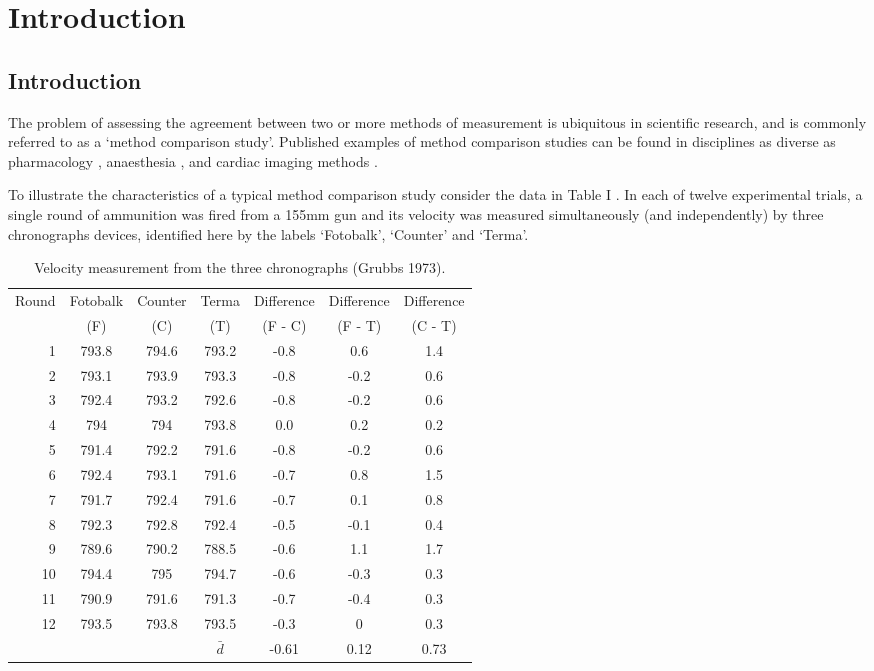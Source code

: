 \documentclass[Main.tex]{subfiles}
\begin{document}
\tableofcontents \setcounter{tocdepth}{2}

\chapter{Introduction}

\section{Introduction}
The problem of assessing the agreement between two or more methods
of measurement is ubiquitous in scientific research, and is
commonly referred to as a `method comparison study'. Published
examples of method comparison studies can be found in disciplines
as diverse as pharmacology \citep{ludbrook97}, anaesthesia
\citep{Myles}, and cardiac imaging methods \citep{Krumm}.


To illustrate the characteristics of a typical method comparison
study consider the data in Table I \citep{Grubbs73}. In each of
twelve experimental trials, a single round of ammunition was fired
from a 155mm gun and its velocity was measured simultaneously (and
independently) by three chronographs devices, identified here by
the labels `Fotobalk', `Counter' and `Terma'.




\begin{table}[ht]
	\begin{center}
		\begin{tabular}{|r|ccc|c|c|c|}

			\hline
Round	&	Fotobalk	&	Counter	&	Terma	&	Difference	&	Difference	&	Difference	\\
&	(F)	&	(C)	&	(T)	&	(F - C)	&	(F - T)	&	(C - T)	\\ 			\hline \hline
1	&	793.8	&	794.6	&	793.2	&	-0.8	&	0.6	&	1.4	\\
2	&	793.1	&	793.9	&	793.3	&	-0.8	&	-0.2	&	0.6	\\
3	&	792.4	&	793.2	&	792.6	&	-0.8	&	-0.2	&	0.6	\\
4	&	794\phantom{.0}	&	794\phantom{.0}	&	793.8	&	0.0	&	0.2	&	0.2	\\
5	&	791.4	&	792.2	&	791.6	&	-0.8	&	-0.2	&	0.6	\\
6	&	792.4	&	793.1	&	791.6	&	-0.7	&	0.8	&	1.5	\\
7	&	791.7	&	792.4	&	791.6	&	-0.7	&	0.1	&	0.8	\\
8	&	792.3	&	792.8	&	792.4	&	-0.5	&	-0.1	&	0.4	\\
9	&	789.6	&	790.2	&	788.5	&	-0.6	&	1.1	&	1.7	\\
10	&	794.4	&	795	&	794.7	&	-0.6	&	-0.3	&	0.3	\\
11	&	790.9	&	791.6	&	791.3	&	-0.7	&	-0.4	&	0.3	\\
12	&	793.5	&	793.8	&	793.5	&	-0.3	&	0	&	0.3	\\ 			\hline
&		&		&	$\bar{d}$	&	-0.61	&	0.12	&	0.73	\\

			\hline
		\end{tabular}
		\caption{Velocity measurement from the three chronographs (Grubbs
			1973).}
	\end{center}
\end{table}
\end{document}
